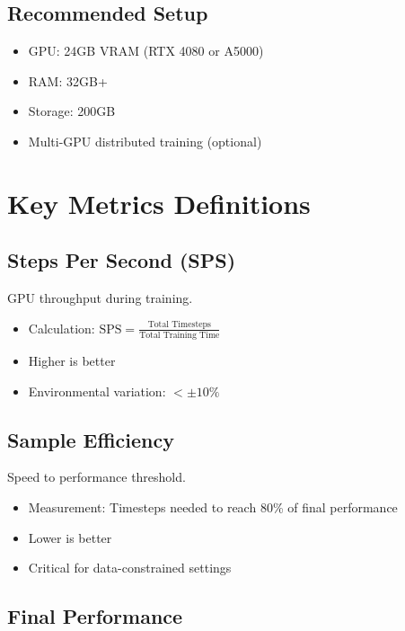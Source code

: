 \documentclass[12pt,a4paper,openany]{report}
\begin{document}
\section{Recommended Setup}

\begin{itemize}
    \item GPU: 24GB VRAM (RTX 4080 or A5000)
    \item RAM: 32GB+
    \item Storage: 200GB
    \item Multi-GPU distributed training (optional)
\end{itemize}

\chapter{Key Metrics Definitions}

\section{Steps Per Second (SPS)}

GPU throughput during training.

\begin{itemize}
    \item Calculation: $\text{SPS} = \frac{\text{Total Timesteps}}{\text{Total Training Time}}$
    \item Higher is better
    \item Environmental variation: $< \pm 10\%$
\end{itemize}

\section{Sample Efficiency}

Speed to performance threshold.

\begin{itemize}
    \item Measurement: Timesteps needed to reach 80\% of final performance
    \item Lower is better
    \item Critical for data-constrained settings
\end{itemize}

\section{Final Performance}
\end{document}
